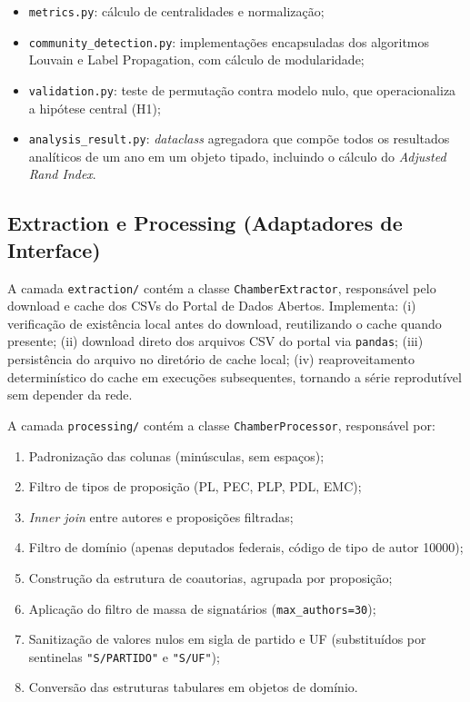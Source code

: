 \documentclass[
      12pt,
      a4paper,
      openright,
      oneside,
      chapter=TITLE,
      section=TITLE,
      english,
      french,
      spanish,
      brazilian
    ]{abntex2}
\begin{document}
    \begin{itemize}
        \item \texttt{metrics.py}: cálculo de centralidades e normalização;
        \item \texttt{community\_detection.py}: implementações encapsuladas dos algoritmos Louvain e Label Propagation, com cálculo de modularidade;
        \item \texttt{validation.py}: teste de permutação contra modelo nulo, que operacionaliza a hipótese central (H1);
        \item \texttt{analysis\_result.py}: \textit{dataclass} agregadora que compõe todos os resultados analíticos de um ano em um objeto tipado, incluindo o cálculo do \textit{Adjusted Rand Index}.
    \end{itemize}
    
    \subsection{Extraction e Processing (Adaptadores de Interface)}
    
    A camada \texttt{extraction/} contém a classe \texttt{ChamberExtractor}, responsável pelo download e cache dos CSVs do Portal de Dados Abertos. Implementa: (i) verificação de existência local antes do download, reutilizando o cache quando presente; (ii) download direto dos arquivos CSV do portal via \texttt{pandas}; (iii) persistência do arquivo no diretório de cache local; (iv) reaproveitamento determinístico do cache em execuções subsequentes, tornando a série reprodutível sem depender da rede.
    
    A camada \texttt{processing/} contém a classe \texttt{ChamberProcessor}, responsável por:
    
    \begin{enumerate}
        \item Padronização das colunas (minúsculas, sem espaços);
        \item Filtro de tipos de proposição (PL, PEC, PLP, PDL, EMC);
        \item \textit{Inner join} entre autores e proposições filtradas;
        \item Filtro de domínio (apenas deputados federais, código de tipo de autor 10000);
        \item Construção da estrutura de coautorias, agrupada por proposição;
        \item Aplicação do filtro de massa de signatários (\texttt{max\_authors=30});
        \item Sanitização de valores nulos em sigla de partido e UF (substituídos por sentinelas \texttt{"S/PARTIDO"} e \texttt{"S/UF"});
        \item Conversão das estruturas tabulares em objetos de domínio.
    \end{enumerate}
    
\end{document}
